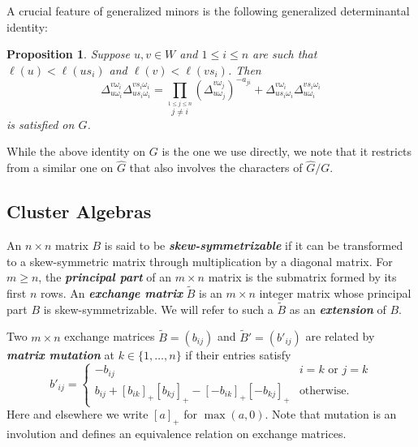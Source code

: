 \documentclass[12pt]{amsart}
\newcommand{\newword}[1]{\textbf{\emph{#1}}}
\newtheorem{proposition}[theorem]{Proposition}
\theoremstyle{remark}
\numberwithin{equation}{section}
\numberwithin{figure}{section}
\begin{document}
A crucial feature of generalized minors is the following generalized determinantal identity:

\begin{proposition}\cite{FZ99,Wil13}
  \label{prop:fundid}
  Suppose $u,v \in W$ and $1 \leq i \leq n$ are such that $\ell(u)<\ell(us_i)$ and $\ell(v)<\ell(vs_i)$.
  Then 
  \begin{equation}
    \label{eq:fundid}
    \Delta_{u\omega_i}^{v\omega_i} \Delta_{us_i\omega_i}^{vs_i\omega_i} 
    =
    \prod_{\stackrel{1\leq j \leq n}{j\neq i}}\left(\Delta_{u\omega_j}^{v\omega_j}\right)^{-a_{ji}}
    +
    \Delta_{us_i\omega_i}^{v\omega_i} \Delta_{u\omega_i}^{vs_i\omega_i}
  \end{equation}
  is satisfied on $G$.
\end{proposition}

While the above identity on $G$ is the one we use directly, we note that it restricts from a similar one on $\widehat{G}$ that also involves the characters of $\widehat{G}/G$.

\subsection{Cluster Algebras}\label{sec:clusteralgebras}
An $n\times n$ matrix $B$ is said to be \newword{skew-symmetrizable} if it can be transformed to a skew-symmetric matrix through multiplication by a diagonal matrix.
For $m \geq n$, the \newword{principal part} of an $m \times n$ matrix is the submatrix formed by its first $n$ rows.
An \newword{exchange matrix} $\widetilde B$ is an $m\times n$ integer matrix whose principal part $B$ is skew-symmetrizable.
We will refer to such a $\widetilde B$ as an \newword{extension} of $B$.

Two $m\times n$ exchange matrices $\widetilde B=(b_{ij})$ and $\widetilde B'=(b'_{ij})$ are related by \newword{matrix mutation} at $k \in \{1,\dotsc,n\}$ if their entries satisfy 
\begin{equation}\label{eq:matrix mutation}
  b'_{ij} = \begin{cases}
  -b_{ij} & i = k \text{ or } j = k\\
  b_{ij} + [b_{ik}]_+ [b_{kj}]_+ - [-b_{ik}]_+ [-b_{kj}]_+ & \text{otherwise.}
  \end{cases}
\end{equation}
Here and elsewhere we write $[a]_+$ for $\max(a,0)$.
Note that mutation is an involution and defines an equivalence relation on exchange matrices.
\end{document}
